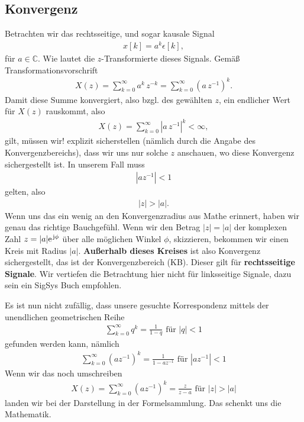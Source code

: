 \subsection*{Konvergenz}
Betrachten wir das rechtsseitige, und sogar kausale Signal
\begin{align}
x[k] = a^k \epsilon[k],
\end{align}
für $a\in\mathbb{C}$.
%
Wie lautet die $z$-Transformierte dieses Signals. Gemäß Transformationsvorschrift
\begin{align}
X(z) = \sum_{k=0}^{\infty} a^k \, z^{-k} = \sum_{k=0}^{\infty} (a \, z^{-1})^k.
\end{align}
Damit diese Summe konvergiert, also bzgl. des gewählten $z$, ein endlicher Wert
für $X(z)$ rauskommt, also
\begin{align}
X(z) = \sum_{k=0}^{\infty} |a \, z^{-1}|^k < \infty,
\end{align}
gilt, müssen wir! explizit sicherstellen (nämlich durch die Angabe des
Konvergenzbereichs), dass wir uns nur solche $z$ anschauen, wo diese Konvergenz
sichergestellt ist. In unserem Fall muss
\begin{align}
|a z^{-1}| < 1
\end{align}
gelten, also
\begin{align}
|z| > |a|.
\end{align}
%
Wenn uns das ein wenig an den Konvergenzradius aus Mathe erinnert, haben wir
genau das richtige Bauchgefühl. Wenn wir den Betrag $|z|=|a|$
der komplexen Zahl $z = |a| \e^{\im\phi}$ über alle möglichen Winkel $\phi$,
skizzieren, bekommen wir einen Kreis mit Radius $|a|$.
\textbf{Außerhalb dieses Kreises}
ist also Konvergenz sichergestellt, das ist der Konvergenzbereich (KB).
Dieser gilt für \textbf{rechtsseitige Signale}. Wir vertiefen die Betrachtung
hier nicht für linksseitige Signale, dazu sein ein SigSys Buch empfohlen.

Es ist nun nicht zufällig, dass unsere gesuchte
Korrespondenz mittels der unendlichen geometrischen Reihe
\begin{align}
\sum_{k=0}^\infty q^k = \frac{1}{1-q}\text{ für }|q|<1
\end{align}
gefunden werden kann, nämlich
\begin{align}
\sum_{k=0}^\infty (a z^{-1})^k = \frac{1}{1-a z^{-1}}\text{ für }|a z^{-1}|<1
\end{align}
Wenn wir das noch umschreiben
\begin{align}
X(z) = \sum_{k=0}^\infty (a z^{-1})^k = \frac{z}{z-a}\text{ für } |z|>|a|
\end{align}
landen wir bei der Darstellung in der Formelsammlung.
%
Das schenkt uns die Mathematik.

